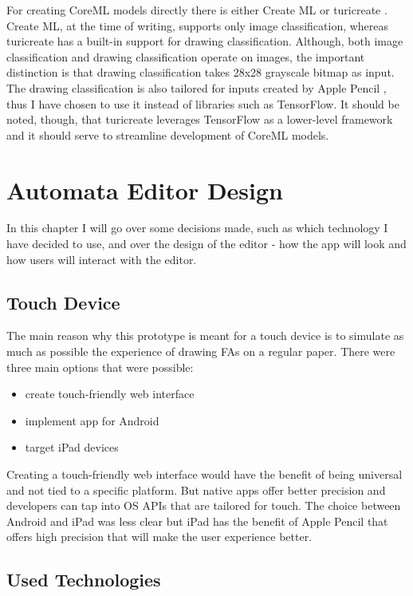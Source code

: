 For creating CoreML models directly there is either Create ML \cite{create-ml} or turicreate \cite{turicreate}. Create ML, at the time of writing, supports only image classification, whereas turicreate has a built-in support for drawing classification. Although, both image classification and drawing classification operate on images, the important distinction is that drawing classification takes 28x28 grayscale bitmap as input. The drawing classification is also tailored for inputs created by Apple Pencil \cite{drawing-classification}, thus I have chosen to use it instead of libraries such as TensorFlow. It should be noted, though, that turicreate leverages TensorFlow as a lower-level framework and it should serve to streamline development of CoreML models.

\chapter{Automata Editor Design}
\label{chap:design}

In this chapter I will go over some decisions made, such as which technology I have decided to use, and over the design of the editor - how the app will look and how users will interact with the editor.

\section{Touch Device}
The main reason why this prototype is meant for a touch device is to simulate as much as possible the experience of drawing FAs on a regular paper. There were three main options that were possible:
\begin{itemize}
    \item create touch-friendly web interface
    \item implement app for Android
    \item target iPad devices
\end{itemize}
Creating a touch-friendly web interface would have the benefit of being universal and not tied to a specific platform. But native apps offer better precision and developers can tap into OS APIs that are tailored for touch. The choice between Android and iPad was less clear but iPad has the benefit of Apple Pencil \cite{apple-pencil} that offers high precision that will make the user experience better.

\section{Used Technologies}

